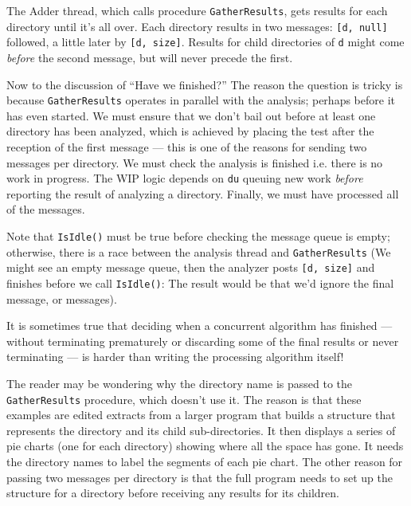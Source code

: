 The Adder thread, which calls procedure \texttt{GatherResults}, gets results for
each directory until it's all over. Each directory results in two messages:
\texttt{[d, null]} followed, a little later by \texttt{[d, size]}.  Results for
child directories of \texttt{d} might come {\em before} the second message, but
will never precede the first.

{\small
{}
}

Now to the discussion of ``Have we finished?'' The reason the question is tricky
is because \texttt{GatherResults} operates in parallel with the analysis;
perhaps before it has even started.  We must ensure that we don't bail out
before at least one directory has been analyzed, which is achieved by placing
the test after the reception of the first message --- this is one of the reasons
for sending two messages per directory. We must check the analysis is finished
i.e. there is no work in progress.  The WIP logic depends on \texttt{du} queuing
new work {\em before} reporting the result of analyzing a directory. Finally, we
must have processed all of the messages.

Note that \texttt{IsIdle()} must be true before checking the message queue is
empty; otherwise, there is a race between the analysis thread and
\texttt{GatherResults} (We might see an empty message queue, then the analyzer
posts \texttt{[d, size]} and finishes before we call \texttt{IsIdle()}: The
result would be that we'd ignore the final message, or messages).

It is sometimes true that deciding when a concurrent algorithm has finished ---
without terminating prematurely or discarding some of the final results or never
terminating --- is harder than writing the processing algorithm itself!

The reader may be wondering why the directory name is passed to the
\texttt{GatherResults} procedure, which doesn't use it.  The reason is that
these examples are edited extracts from a larger program that builds a structure
that represents the directory and its child sub-directories. It then displays a
series of pie charts (one for each directory) showing where all the space has
gone.  It needs the directory names to label the segments of each pie chart. The
other reason for passing two messages per directory is that the full program
needs to set up the structure for a directory before receiving any results for
its children.

